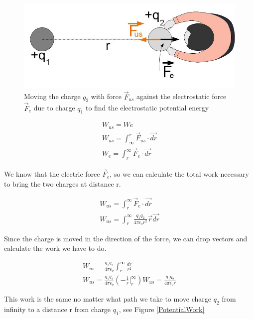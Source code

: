 \documentclass{ximera}
\begin{document}
\begin{figure}[htbp]
\begin{center}
\includegraphics[scale=0.5]{../jpg/Two_Static_Charges_Potential.jpg}
\end{center}
\caption{Moving the charge $q_2$ with force $\vec{F}_{us}$ against the electrostatic force $\vec{F}_e$ due to charge $q_1$ to find the electrostatic potential energy}\label{Potential1}
\end{figure}


\begin{eqnarray}
W_{us}=W{e} \\
W_{us}= \int_{\infty}^{r} \vec{F}_{us} \cdot \vec{dr} \\
W_{e}=  \int_{r}^{\infty} \vec{F}_{e} \cdot \vec{dr} 
\end{eqnarray}

We know that the electric force $\vec{F}_e$, so we can calculate the total work necessary to bring the two charges at distance r.

\begin{eqnarray}
W_{us}= \int_{r}^{\infty} \vec{F}_{e} \cdot \vec{dr} \\
W_{us}= \int_{r}^{\infty} \frac{q_1 q_2}{4 \pi \epsilon_o r^2} \vec{r} \vec{dr}
\end{eqnarray}

Since the charge is moved in the direction of the force, we can drop vectors and calculate the work we have to do.

\begin{eqnarray}
W_{us}= \frac{q_1 q_2}{4 \pi \epsilon_o} \int_{r}^{\infty} \frac{dr}{r^2} \\
W_{us}=  \frac{q_1 q_2}{4 \pi \epsilon_o} (-\frac{1}{r}\Big|_{r}^{\infty})
W_{us}=  \frac{q_1 q_2}{4 \pi \epsilon_o r} \label{WorkPoinCharge}
\end{eqnarray}

This work is the same no matter what path we take to move charge $q_2$ from infinity to a distance r from charge $q_1$, see Figure \ref{PotentialWork}
\end{document}

